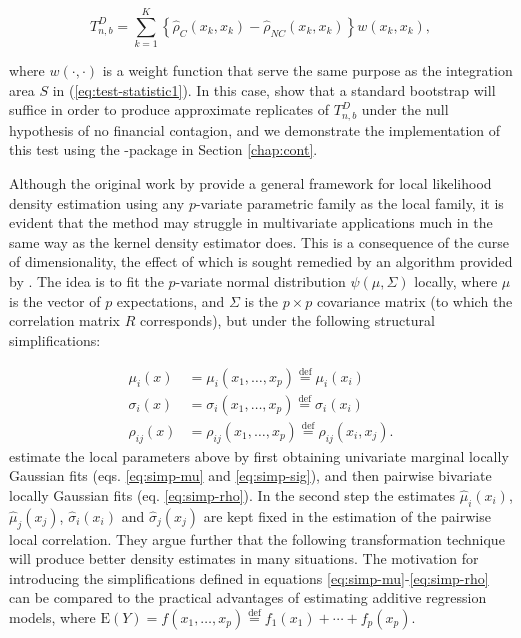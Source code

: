 $$T_{n,b}^D = \sum_{k=1}^K \left\{\widehat\rho_C(x_k, x_k) - \widehat\rho_{NC}(x_k, x_k) \right\}w(x_k,x_k),$$

where $w(\cdot, \cdot)$ is a weight function that serve the same purpose as the integration area $S$ in (\ref{eq:test-statistic1}). In this case, \citet{stov:tjos:huft:2014} show that a standard bootstrap will suffice in order to produce approximate replicates of $T_{n,b}^D$ under the null hypothesis of no financial contagion, and we demonstrate the implementation of this test using the -package in Section \ref{chap:cont}.

Although the original work by \citet{hjor:jone:1996} provide a general framework for local likelihood density estimation using any $p$-variate parametric family as the local family, it is evident that the method may struggle in multivariate applications much in the same way as the kernel density estimator does. This is a consequence of the curse of dimensionality, the effect of which is sought remedied by an algorithm provided by \citet{otne:tjos:2017}. The idea is to fit the $p$-variate normal distribution $\psi(\mu, \Sigma)$ locally, where $\mu$ is the vector of $p$ expectations, and $\Sigma$ is the $p\times p$ covariance matrix (to which the correlation matrix $R$ corresponds), but under the following structural simplifications:

\begin{align}
\mu_i(x) &= \mu_i(x_1, \ldots, x_p) \stackrel{\textrm{def}}{=} \mu_i(x_i) \label{eq:simp-mu}\\
\sigma_i(x) &= \sigma_i(x_1, \ldots, x_p)  \stackrel{\textrm{def}}{=} \sigma_i(x_i) \label{eq:simp-sig} \\
\rho_{ij}(x) &= \rho_{ij}(x_1, \ldots, x_p) \stackrel{\textrm{def}}{=} \rho_{ij}(x_i, x_j). \label{eq:simp-rho}
\end{align}
\citet{otne:tjos:2017} estimate the local parameters above by first obtaining univariate marginal locally Gaussian fits (eqs. \ref{eq:simp-mu} and \ref{eq:simp-sig}), and then pairwise bivariate locally Gaussian fits (eq. \ref{eq:simp-rho}). In the second step the estimates $\widehat\mu_i(x_i)$, $\widehat\mu_j(x_j)$, $\widehat\sigma_i(x_i)$ and $\widehat\sigma_j(x_j)$ are kept fixed in the estimation of the pairwise local correlation. They argue further that the following transformation technique will produce better density estimates in many situations. The motivation for introducing the simplifications defined in equations \ref{eq:simp-mu}-\ref{eq:simp-rho} can be compared to the practical advantages of estimating additive regression models, where $\textrm{E}(Y) = f(x_1, \ldots, x_p) \stackrel{\textrm{def}}{=} f_1(x_1) + \cdots + f_p(x_p)$.

